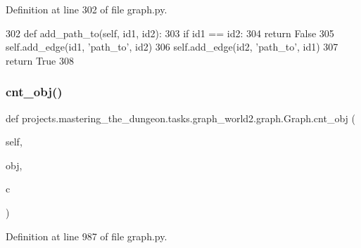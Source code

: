 Definition at line 302 of file graph.\+py.


\begin{DoxyCode}
302     \textcolor{keyword}{def }add\_path\_to(self, id1, id2):
303         \textcolor{keywordflow}{if} id1 == id2:
304             \textcolor{keywordflow}{return} \textcolor{keyword}{False}
305         self.add\_edge(id1, \textcolor{stringliteral}{'path\_to'}, id2)
306         self.add\_edge(id2, \textcolor{stringliteral}{'path\_to'}, id1)
307         \textcolor{keywordflow}{return} \textcolor{keyword}{True}
308 
\end{DoxyCode}
\mbox{\label{classprojects_1_1mastering__the__dungeon_1_1tasks_1_1graph__world2_1_1graph_1_1Graph_ac230ca7418811a6c9c4d9880c4d6334f}} 
\subsubsection{\texorpdfstring{cnt\+\_\+obj()}{cnt\_obj()}}
{\footnotesize\ttfamily def projects.\+mastering\+\_\+the\+\_\+dungeon.\+tasks.\+graph\+\_\+world2.\+graph.\+Graph.\+cnt\+\_\+obj (\begin{DoxyParamCaption}\item[{}]{self,  }\item[{}]{obj,  }\item[{}]{c }\end{DoxyParamCaption})}



Definition at line 987 of file graph.\+py.


